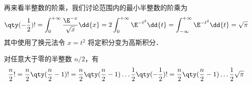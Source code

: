 再来看半整数的阶乘，我们讨论范围内的最小半整数的阶乘为 
\begin{equation}
\qty(-\frac12) ! = \int_0^{+\infty} \frac{\E^{-x}}{\sqrt x}\dd{x} = 2\int_0^{+\infty} \E^{-t^2} \dd{t} = \int_{-\infty}^{+\infty} \E^{-t^2} \dd{t} = \sqrt{\pi}
\end{equation}
其中使用了换元法令 $x = t^2$ 将定积分变为高斯积分．

对任意大于零的半整数 $n/2$，有
\begin{equation}
\frac{n}{2}! = \frac{n}{2} \qty(\frac{n}{2}-1)! = \frac{n}{2} \qty(\frac{n}{2}-1) \dots \frac12 \qty(-\frac12) ! = \frac{n}{2} \qty(\frac{n}{2}-1) \dots \frac12 \sqrt{\pi}
\end{equation}

